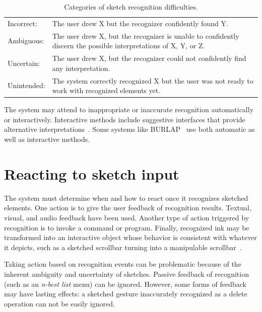 \begin{table}[h]
\begin{center}
\begin{tabular}[h]{l p{8.5cm}}
Incorrect: & The user drew X but the recognizer confidently found
Y. \\

Ambiguous: & The user drew X, but the recognizer is unable to
confidently discern the possible interpretations of X, Y, or Z. \\

Uncertain: & The user drew X, but the recognizer could not confidently
find any interpretation. \\

Unintended: & The system correctly recognized X but the user was not
ready to work with recognized elements yet. \\

\end{tabular}
\label{tab:recognition-errors}
\caption{Categories of sketch recognition difficulties.}
\end{center}
\end{table}

The system may attend to inappropriate or inaccurate recognition
automatically or interactively. Interactive methods include suggestive
interfaces that provide alternative
interpretations~\cite{igarashi-suggestive}. Some systems like
BURLAP~\cite{mankoff-burlap} use both automatic as well as interactive
methods.

\section{Reacting to sketch input}
\label{sec:recognition-action}

The system must determine when and how to react once it recognizes
sketched elements. One action is to give the user feedback of
recognition results. Textual, visual, and audio feedback have been
used. Another type of action triggered by recognition is to invoke a
command or program. Finally, recognized ink may be transformed into an
interactive object whose behavior is consistent with whatever it
depicts, such as a sketched scrollbar turning into a manipulable
scrollbar~\cite{landay-silk}.

Taking action based on recognition events can be problematic because
of the inherent ambiguity and uncertainty of sketches. Passive
feedback of recognition (such as an \textit{n-best list} menu) can be
ignored. However, some forms of feedback may have lasting effects: a
sketched gesture inaccurately recognized as a delete operation can not
be easily ignored.

